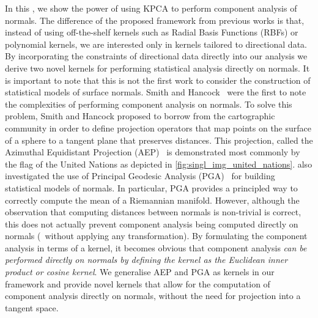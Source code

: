 In this , we show the power of using KPCA to perform
component analysis of normals. The difference of the proposed framework from
previous works is that, instead of using off-the-shelf kernels such as Radial
Basis Functions (RBFs) or polynomial kernels, we are interested only in kernels
tailored to directional data. By incorporating the constraints of directional
data directly into our analysis we derive two novel kernels for performing
statistical analysis directly on normals. It is important to note that this is
not the first work to consider the construction of statistical models of surface
normals. Smith and Hancock~\cite{smith2006recovering,smith2008facial} were the
first to note the complexities of performing component analysis on normals. To
solve this problem, Smith and Hancock proposed to borrow from the cartographic
community in order to define projection operators that map points on the surface
of a sphere to a tangent plane that preserves distances. This projection, called
the Azimuthal Equidistant Projection (AEP)~\cite{snyder1987map} is demonstrated
most commonly by the flag of the United Nations as depicted in
\cref{fig:singl_img_united_nations}.
\citet{smith2008facial} also investigated the use of
Principal Geodesic Analysis (PGA)~\cite{fletcher2004principal,smith2008facial}
for building statistical models of normals. In particular, PGA provides a
principled way to correctly compute the mean of a Riemannian manifold. However,
although the observation that computing distances between normals is non-trivial
is correct, this does not actually prevent component analysis being computed
directly on normals (\ie~without applying any transformation). By formulating
the component analysis in terms of a kernel, it becomes obvious that component
analysis \textit{can be performed directly on normals by defining the kernel as
the Euclidean inner product or cosine kernel}. We generalise AEP and PGA as
kernels in our framework and provide novel kernels that allow for the
computation of component analysis directly on normals, without the need for
projection into a tangent space.

